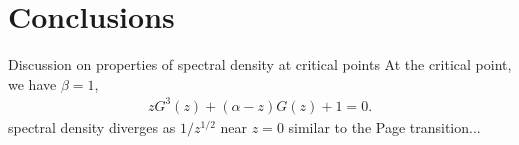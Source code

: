 \documentclass[aps,pra,groupedaddress,onecolumn,notitlepage,superscriptaddress,10pt]{revtex4-1}
\begin{document}
\section{Conclusions}

Discussion on properties of spectral density at critical points
At the critical point, we have $\beta=1$,
\begin{align}
z G^3(z) + (\alpha -z ) G(z) +1 =0.
\end{align}
spectral density diverges as $1/z^{1/2}$ near $z=0$ similar to the Page transition...


\acknowledgements


\end{document}
